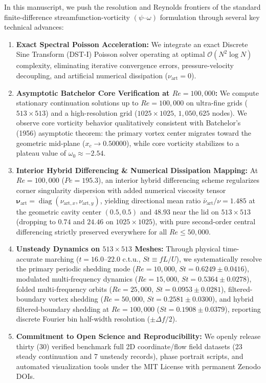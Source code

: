 \documentclass[11pt]{article}
\begin{document}
In this manuscript, we push the resolution and Reynolds frontiers of the standard finite-difference streamfunction-vorticity $(\psi\text{--}\omega)$ formulation through several key technical advances:
\begin{enumerate}
    \item \textbf{Exact Spectral Poisson Acceleration:} We integrate an exact Discrete Sine Transform (DST-I) Poisson solver operating at optimal $\mathcal{O}(N^2 \log N)$ complexity, eliminating iterative convergence errors, pressure-velocity decoupling, and artificial numerical dissipation ($\nu_{\text{art}} = 0$).
    \item \textbf{Asymptotic Batchelor Core Verification at $Re = 100,000$:} We compute stationary continuation solutions up to $Re = 100,000$ on ultra-fine grids ($513 \times 513$) and a high-resolution grid ($1025 \times 1025$, $1,050,625$ nodes). We observe core vorticity behavior qualitatively consistent with Batchelor's (1956) asymptotic theorem: the primary vortex center migrates toward the geometric mid-plane ($x_c \to 0.50000$), while core vorticity stabilizes to a plateau value of $\omega_0 \approx -2.54$.
    \item \textbf{Interior Hybrid Differencing \& Numerical Dissipation Mapping:} At $Re = 100,000$ ($Pe = 195.3$), an interior hybrid differencing scheme regularizes corner singularity dispersion with added numerical viscosity tensor $\boldsymbol{\nu}_{\text{art}} = \operatorname{diag}(\nu_{\text{art},x}, \nu_{\text{art},y})$, yielding directional mean ratio $\bar{\nu}_{\text{art}}/\nu = 1.485$ at the geometric cavity center $(0.5, 0.5)$ and $48.93$ near the lid on $513 \times 513$ (dropping to $0.74$ and $24.46$ on $1025 \times 1025$), with pure second-order central differencing strictly preserved everywhere for all $Re \le 50,000$.
    \item \textbf{Unsteady Dynamics on $513 \times 513$ Meshes:} Through physical time-accurate marching ($t = 16.0$--$22.0$ c.t.u., $St \equiv fL/U$), we systematically resolve the primary periodic shedding mode ($Re = 10,000$, $St = 0.6249 \pm 0.0416$), modulated multi-frequency dynamics ($Re = 15,000$, $St = 0.5364 \pm 0.0278$), folded multi-frequency orbits ($Re = 25,000$, $St = 0.0953 \pm 0.0281$), filtered-boundary vortex shedding ($Re = 50,000$, $St = 0.2581 \pm 0.0300$), and hybrid filtered-boundary shedding at $Re = 100,000$ ($St = 0.1908 \pm 0.0379$), reporting discrete Fourier bin half-width resolution ($\pm \Delta f / 2$).
    \item \textbf{Commitment to Open Science and Reproducibility:} We openly release thirty (30) verified benchmark full 2D coordinate/flow field datasets (23 steady continuation and 7 unsteady records), phase portrait scripts, and automated visualization tools under the MIT License with permanent Zenodo DOIs.
\end{enumerate}
\end{document}
